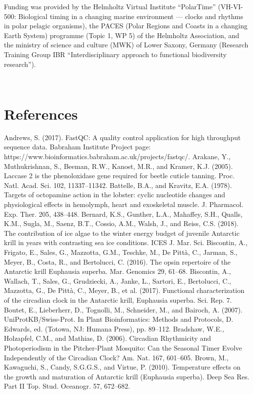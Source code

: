 Funding was provided by the Helmholtz Virtual Institute “PolarTime” (VH-VI-500:
Biological timing in a changing marine environment — clocks and rhythms in
polar pelagic organisms), the PACES (Polar Regions and Coasts in a changing
Earth System) programme (Topic 1, WP 5) of the Helmholtz Association, and the
ministry of science and culture (MWK) of Lower Saxony, Germany (Research
Training Group IBR “Interdisciplinary approach to functional biodiversity
research”).

 
\section{References}
Andrews, S. (2017). FastQC: A quality control application for high throughput sequence data. Babraham Institute Project page: https://www.bioinformatics.babraham.ac.uk/projects/fastqc/.
Arakane, Y., Muthukrishnan, S., Beeman, R.W., Kanost, M.R., and Kramer, K.J. (2005). Laccase 2 is the phenoloxidase gene required for beetle cuticle tanning. Proc. Natl. Acad. Sci. 102, 11337–11342.
Battelle, B.A., and Kravitz, E.A. (1978). Targets of octopamine action in the lobster: cyclic nucleotide changes and physiological effects in hemolymph, heart and exoskeletal muscle. J. Pharmacol. Exp. Ther. 205, 438–448.
Bernard, K.S., Gunther, L.A., Mahaffey, S.H., Qualls, K.M., Sugla, M., Saenz, B.T., Cossio, A.M., Walsh, J., and Reiss, C.S. (2018). The contribution of ice algae to the winter energy budget of juvenile Antarctic krill in years with contrasting sea ice conditions. ICES J. Mar. Sci.
Biscontin, A., Frigato, E., Sales, G., Mazzotta, G.M., Teschke, M., De Pittà, C., Jarman, S., Meyer, B., Costa, R., and Bertolucci, C. (2016). The opsin repertoire of the Antarctic krill Euphausia superba. Mar. Genomics 29, 61–68.
Biscontin, A., Wallach, T., Sales, G., Grudziecki, A., Janke, L., Sartori, E., Bertolucci, C., Mazzotta, G., De Pittà, C., Meyer, B., et al. (2017). Functional characterization of the circadian clock in the Antarctic krill, Euphausia superba. Sci. Rep. 7.
Boutet, E., Lieberherr, D., Tognolli, M., Schneider, M., and Bairoch, A. (2007). UniProtKB/Swiss-Prot. In Plant Bioinformatics: Methods and Protocols, D. Edwards, ed. (Totowa, NJ: Humana Press), pp. 89–112.
Bradshaw, W.E., Holzapfel, C.M., and Mathias, D. (2006). Circadian Rhythmicity and Photoperiodism in the Pitcher‐Plant Mosquito: Can the Seasonal Timer Evolve Independently of the Circadian Clock? Am. Nat. 167, 601–605.
Brown, M., Kawaguchi, S., Candy, S.G.G.S., and Virtue, P. (2010). Temperature effects on the growth and maturation of Antarctic krill (Euphausia superba). Deep Sea Res. Part II Top. Stud. Oceanogr. 57, 672–682.
